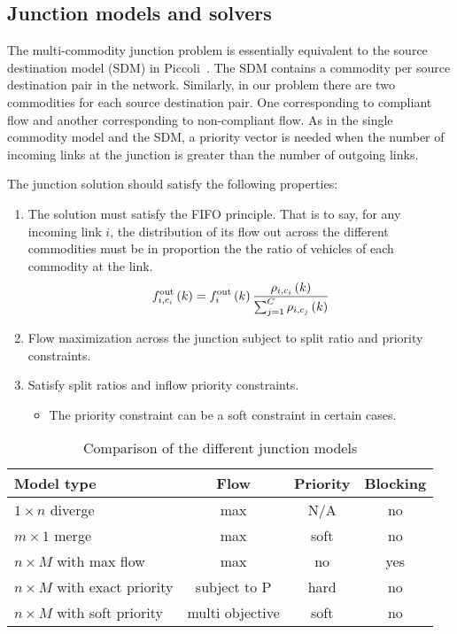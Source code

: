 
\subsection{Junction models and solvers}
\label{sec:junctionModel}
The multi-commodity junction problem is essentially equivalent to the source destination model (SDM) in Piccoli~\cite{piccoli}. The SDM contains a commodity per source destination pair in the network. Similarly, in our problem there are two commodities for each source destination pair. One corresponding to compliant flow and another corresponding to non-compliant flow. As in the single commodity model and the SDM, a priority vector is needed when the number of incoming links at the junction is greater than the number of outgoing links. 

The junction solution should satisfy the following properties:
\begin{enumerate}
\item The solution must satisfy the FIFO principle. That is to say, for any incoming link $i$, the distribution of its flow out across the different commodities must be in proportion the the ratio of vehicles of each commodity at the link. 
	\[
	\flowoutmc{i}{k}{c_i} = \flowout{i}{k} \frac{\densitymc{i}{k}{c_i}}{\sum_{j=1}^{C} \densitymc{i}{k}{c_j}}
	\]
\item Flow maximization across the junction subject to split ratio and priority constraints. 
\item Satisfy split ratios and inflow priority constraints. 
\begin{itemize}
	\item The priority constraint can be a soft constraint in certain cases. 
\end{itemize}
\end{enumerate}


\begin{table}[t]
\label{tab:juncModelComp} \centering
\begin{tabular}{|l|c|c|c|}
\hline
Model type & Flow & Priority & Blocking \\\hline
\hline
$1 \times n$ diverge & max & N/A & no\\
\hline
$m \times 1$ merge & max & soft & no\\
\hline
$n \times M$ with max flow & max & no & yes\\
\hline
$n \times M$ with exact priority& subject to P & hard & no\\
\hline
$n \times M$ with soft priority& multi objective & soft & no\\
\hline
\end{tabular}
\caption{Comparison of the different junction models}
\end{table}
 

